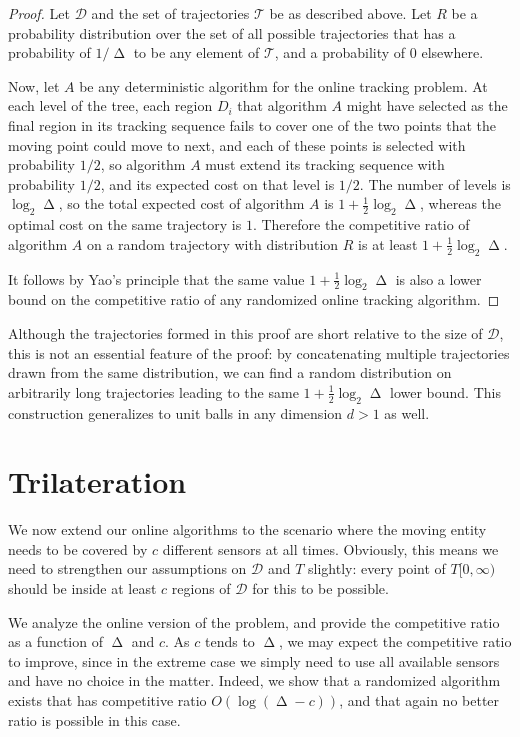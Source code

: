 \documentclass[runningheads]{llncs}
\newcommand {\script} [1] {\ensuremath {\mathcal {#1}}}
\DeclareMathOperator {\ply}{\Delta}
\begin{document}
\begin {proof}
Let $\script D$ and the set of trajectories $\script T$ be as described above. Let $R$ be a probability distribution over the set of all possible trajectories that has a probability of $1 / \ply$ to be any element of $\script T$, and a probability of $0$ elsewhere.
        
Now, let $A$ be any deterministic algorithm for the online tracking problem.  At each level of the tree, each region $D_i$ that algorithm $A$ might have selected as the final region in its tracking sequence fails to cover one of the two points that the moving point could move to next, and each of these points is selected with probability $1/2$, so algorithm $A$ must extend its tracking sequence with probability $1/2$, and its expected cost on that level is $1/2$. The number of levels is $\log_2\ply$, so the total expected cost of algorithm $A$ is $1+\frac12\log_2\ply$, whereas the optimal cost on the same trajectory is $1$. Therefore the competitive ratio of algorithm $A$ on a random trajectory with distribution $R$ is at least $1+\frac12\log_2\ply$.

It follows by Yao's principle that the same value $1+\frac12\log_2\ply$ is also a lower bound on the competitive ratio of any randomized online tracking algorithm.
\end {proof}

Although the trajectories formed in this proof are short relative to the size of $\script D$, this is not an essential feature of the proof: by concatenating multiple trajectories drawn from the same distribution, we can find a random distribution on arbitrarily long trajectories leading to the same $1+\frac12\log_2\ply$ lower bound.
This construction generalizes to unit balls in any dimension $d > 1$ as well.
  
    
\section{Trilateration}

 
  We now extend our online algorithms to the scenario where the moving entity needs to be covered by $c$ different sensors at all times. Obviously, this means we need to strengthen our assumptions on $\script D$ and $T$ slightly: every point of $T[0,\infty)$ should be inside at least $c$ regions of $\script D$ for this to be possible. 
  
  We analyze the online version of the problem, and provide the competitive ratio as a function of $\ply$ and $c$. As $c$ tends to $\ply$, we may expect the competitive ratio to improve, since in the extreme case we simply need to use all available sensors and have no choice in the matter. Indeed, we show that a randomized algorithm exists that has competitive ratio $O (\log (\ply - c))$, and that again no better ratio is possible in this case.
  
\end{document}
